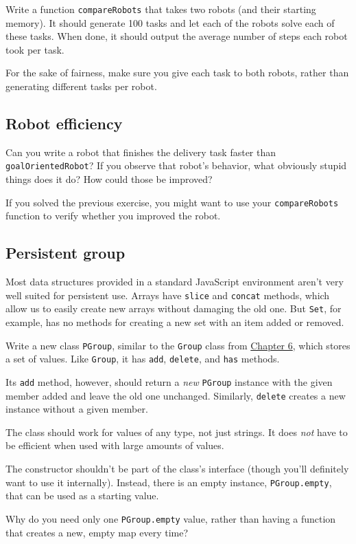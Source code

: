 Write a function \lstinline`compareRobots` that takes two robots (and their starting memory). It should generate 100 tasks and let each of the robots solve each of these tasks. When done, it should output the average number of steps each robot took per task.

For the sake of fairness, make sure you give each task to both robots, rather than generating different tasks per robot.

\subsection{Robot efficiency}

Can you write a robot that finishes the delivery task faster than \lstinline`goalOrientedRobot`? If you observe that robot's behavior, what obviously stupid things does it do? How could those be improved?

If you solved the previous exercise, you might want to use your \lstinline`compareRobots` function to verify whether you improved the robot.

\subsection{Persistent group}

Most data structures provided in a standard JavaScript environment aren't very well suited for persistent use. Arrays have \lstinline`slice` and \lstinline`concat` methods, which allow us to easily create new arrays without damaging the old one. But \lstinline`Set`, for example, has no methods for creating a new set with an item added or removed.

Write a new class \lstinline`PGroup`, similar to the \lstinline`Group` class from \hyperref[object.groups]{Chapter 6}, which stores a set of values. Like \lstinline`Group`, it has \lstinline`add`, \lstinline`delete`, and \lstinline`has` methods.

Its \lstinline`add` method, however, should return a \emph{new} \lstinline`PGroup` instance with the given member added and leave the old one unchanged. Similarly, \lstinline`delete` creates a new instance without a given member.

The class should work for values of any type, not just strings. It does \emph{not} have to be efficient when used with large amounts of values.

The constructor shouldn't be part of the class's interface (though you'll definitely want to use it internally). Instead, there is an empty instance, \lstinline`PGroup.empty`, that can be used as a starting value.

Why do you need only one \lstinline`PGroup.empty` value, rather than having a function that creates a new, empty map every time?
